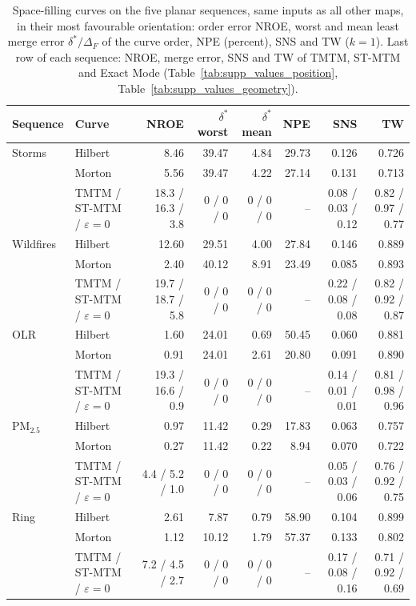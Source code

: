 \begin{table}[H]
\centering\small\setlength{\tabcolsep}{3.2pt}
\caption{Space-filling curves on the five planar sequences, same inputs as all other maps, in their most favourable orientation: order error NROE, worst and mean least merge error $\delta^*/\Delta_F$ of the curve order, NPE (percent), SNS and TW ($k=1$). Last row of each sequence: NROE, merge error, SNS and TW of TMTM, ST-MTM and Exact Mode (Table~\ref{tab:supp_values_position}, Table~\ref{tab:supp_values_geometry}).}\label{tab:supp_space_filling}
\begin{tabular}{llrrrrrr}\toprule
Sequence & Curve & NROE & $\delta^*$ worst & $\delta^*$ mean & NPE & SNS & TW\\\midrule
Storms & Hilbert & 8.46 & 39.47 & 4.84 & 29.73 & 0.126 & 0.726\\
 & Morton & 5.56 & 39.47 & 4.22 & 27.14 & 0.131 & 0.713\\
 & TMTM / ST-MTM / $\varepsilon{=}0$ & 18.3 / 16.3 / 3.8 & 0 / 0 / 0 & 0 / 0 / 0 & -- & 0.08 / 0.03 / 0.12 & 0.82 / 0.97 / 0.77\\
Wildfires & Hilbert & 12.60 & 29.51 & 4.00 & 27.84 & 0.146 & 0.889\\
 & Morton & 2.40 & 40.12 & 8.91 & 23.49 & 0.085 & 0.893\\
 & TMTM / ST-MTM / $\varepsilon{=}0$ & 19.7 / 18.7 / 5.8 & 0 / 0 / 0 & 0 / 0 / 0 & -- & 0.22 / 0.08 / 0.08 & 0.82 / 0.92 / 0.87\\
OLR & Hilbert & 1.60 & 24.01 & 0.69 & 50.45 & 0.060 & 0.881\\
 & Morton & 0.91 & 24.01 & 2.61 & 20.80 & 0.091 & 0.890\\
 & TMTM / ST-MTM / $\varepsilon{=}0$ & 19.3 / 16.6 / 0.9 & 0 / 0 / 0 & 0 / 0 / 0 & -- & 0.14 / 0.01 / 0.01 & 0.81 / 0.98 / 0.96\\
PM$_{2.5}$ & Hilbert & 0.97 & 11.42 & 0.29 & 17.83 & 0.063 & 0.757\\
 & Morton & 0.27 & 11.42 & 0.22 & 8.94 & 0.070 & 0.722\\
 & TMTM / ST-MTM / $\varepsilon{=}0$ & 4.4 / 5.2 / 1.0 & 0 / 0 / 0 & 0 / 0 / 0 & -- & 0.05 / 0.03 / 0.06 & 0.76 / 0.92 / 0.75\\
Ring & Hilbert & 2.61 & 7.87 & 0.79 & 58.90 & 0.104 & 0.899\\
 & Morton & 1.12 & 10.12 & 1.79 & 57.37 & 0.133 & 0.802\\
 & TMTM / ST-MTM / $\varepsilon{=}0$ & 7.2 / 4.5 / 2.7 & 0 / 0 / 0 & 0 / 0 / 0 & -- & 0.17 / 0.08 / 0.16 & 0.71 / 0.92 / 0.69\\

\end{tabular}
\end{table}
